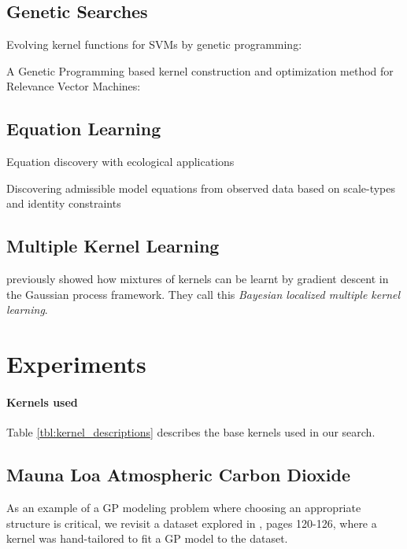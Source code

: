 \documentclass[twoside]{article}
\begin{document}
\subsection{Genetic Searches}

Evolving kernel functions for SVMs by genetic programming: \cite{diosan2007evolving}

A Genetic Programming based kernel construction and optimization method for Relevance Vector Machines: \cite{bing2010gp}

\subsection{Equation Learning}

Equation discovery with ecological applications \cite{dzeroski1999equation}

Discovering admissible model equations from observed data based on scale-types and identity constraints \cite{washio1999discovering}

\subsection{Multiple Kernel Learning}

\cite{christoudias2009bayesian} previously showed how mixtures of kernels can be learnt by gradient descent in the Gaussian process framework.  They call this \emph{Bayesian localized multiple kernel learning}.


\section{Experiments}

\paragraph{Kernels used}
%
Table \ref{tbl:kernel_descriptions} describes the base kernels used in our search.
%



\subsection{Mauna Loa Atmospheric Carbon Dioxide}

As an example of a GP modeling problem where choosing an appropriate structure is critical, we revisit a dataset explored in \cite{rasmussen38gaussian}, pages 120-126, where a kernel was hand-tailored to fit a GP model to the dataset.
\end{document}
